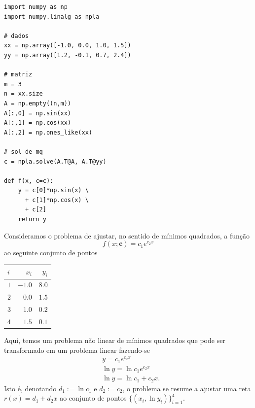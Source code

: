 \begin{ex}
\begin{lstlisting}[caption=mqCurva.py]
import numpy as np
import numpy.linalg as npla

# dados
xx = np.array([-1.0, 0.0, 1.0, 1.5])
yy = np.array([1.2, -0.1, 0.7, 2.4])

# matriz
m = 3
n = xx.size
A = np.empty((n,m))
A[:,0] = np.sin(xx)
A[:,1] = np.cos(xx)
A[:,2] = np.ones_like(xx)

# sol de mq
c = npla.solve(A.T@A, A.T@yy)

def f(x, c=c):
    y = c[0]*np.sin(x) \
      + c[1]*np.cos(x) \
      + c[2]
    return y
\end{lstlisting}

\end{ex}

\begin{ex}\label{cap_ajuste_sec_prob_lin:ex:mq_nlin0}
  Consideramos o problema de ajustar, no sentido de mínimos quadrados, a função
  \begin{equation}
    f(x; \pmb{c}) = c_1e^{c_2x}
  \end{equation}
  ao seguinte conjunto de pontos
  \begin{center}
    \begin{tabular}{lrr}
      $i$ & $x_i$ & $y_i$\\\midrule
      $1$ & $-1.0$ & $8.0$\\
      $2$ &  $0.0$ & $1.5$\\
      $3$ &  $1.0$ & $0.2$\\
      $4$ &  $1.5$ & $0.1$\\\bottomrule           
    \end{tabular}
  \end{center}

Aqui, temos um problema não linear de mínimos quadrados que pode ser transformado em um problema linear fazendo-se
\begin{align}
  & y = c_1e^{c_2x}\\
  & \ln y = \ln c_1e^{c_2x}\\
  & \ln y = \ln c_1 + c_2x.
\end{align}
Isto é, denotando $d_1 := \ln c_1$ e $d_2 := c_2$, o problema se resume a ajustar uma reta $r(x) = d_1 + d_2x$ ao conjunto de pontos $\{(x_i, \ln y_i)\}_{i=1}^4$.


\end{ex}
